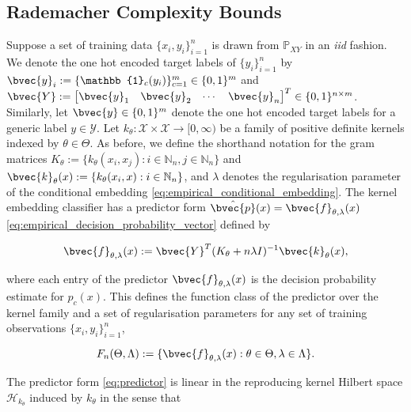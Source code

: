 \documentclass{article}
\begin{document}
	\subsection{Rademacher Complexity Bounds}
	\label{app:rademacher_complexity_theorems}

		Suppose a set of training data $\{x_{i}, y_{i}\}_{i = 1}^{n}$ is drawn from $\mathbb{P}_{X Y}$ in an \textit{iid} fashion. We denote the one hot encoded target labels of $\{y_{i}\}_{i = 1}^{n}$ by $\bvec{y}_{i} := \{\mathbb{1}_{c}(y_{i})\}_{c = 1}^{m} \in \{0, 1\}^{m}$ and $\bvec{Y} := \begin{bmatrix} \bvec{y}_{1} & \bvec{y}_{2} & \cdots & \bvec{y}_{n} \end{bmatrix}^{T} \in \{0, 1\}^{n \times m}$. Similarly, let $\bvec{y} \in \{0, 1\}^{m}$ denote the one hot encoded target labels for a generic label $y \in \mathcal{Y}$. Let $k_{\theta} : \mathcal{X} \times \mathcal{X} \to [0, \infty)$ be a family of positive definite kernels indexed by $\theta \in \Theta$. As before, we define the shorthand notation for the gram matrices $K_{\theta} := \{k_{\theta}(x_{i}, x_{j}) : i \in \mathbb{N}_{n}, j \in \mathbb{N}_{n}\}$ and $\bvec{k}_{\theta}(x) := \{k_{\theta}(x_{i}, x) : i \in \mathbb{N}_{n}\}$, and $\lambda$ denotes the regularisation parameter of the conditional embedding \eqref{eq:empirical_conditional_embedding}. The kernel embedding classifier has a predictor form $\hat{\bvec{p}}(x) = \bvec{f}_{\theta, \lambda}(x)$ \eqref{eq:empirical_decision_probability_vector} defined by
	
		\begin{equation}
			\bvec{f}_{\theta, \lambda}(x) := \bvec{Y}^{T} (K_{\theta} + n \lambda I)^{-1} \bvec{k}_{\theta}(x),
		\label{eq:predictor}
		\end{equation}
		
		where each entry of the predictor $\bvec{f}_{\theta, \lambda}(x)$ is the decision probability estimate for $p_{c}(x)$. This defines the function class of the predictor over the kernel family and a set of regularisation parameters for any set of training observations $\{x_{i}, y_{i}\}_{i = 1}^{n}$,
		
		\begin{equation}
			F_{n}(\Theta, \Lambda) := \{ \bvec{f}_{\theta, \lambda}(x) : \theta \in \Theta, \lambda \in \Lambda \}.
		\label{eq:predictor_class}
		\end{equation}
		
		The predictor form \eqref{eq:predictor} is linear in the reproducing kernel Hilbert space $\mathcal{H}_{k_{\theta}}$ induced by $k_{\theta}$ in the sense that
		
\end{document}
